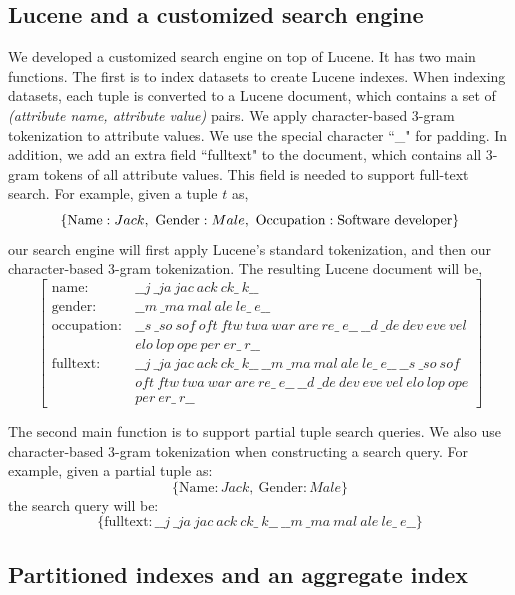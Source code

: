 \subsection{Lucene and a customized search engine}
We developed a customized search engine on top of Lucene. It has two main functions. The first is to index datasets to create Lucene indexes. 
When indexing datasets, each tuple is converted to a Lucene document, which contains a set of \emph{(attribute name, attribute value)} pairs. We apply character-based 3-gram tokenization to attribute values. We use the special character ``\_" for padding. In addition, we add an extra field ``fulltext" to the document, which contains all 3-gram tokens of all attribute values. This field is needed to support full-text search.
For example, given a tuple $t$ as, 
$$
\{\mathrm{Name}:Jack,\ \mathrm{Gender}:Male,\ \mathrm{Occupation}:\makebox{Software developer}\}
$$
our search engine will first apply Lucene's standard tokenization, and then our character-based 3-gram tokenization. The resulting Lucene document will be,
$$
\left[\begin{array}{rl}
\mathrm{name}: & \_\_j\ \_ja\ jac\ ack\ ck\_\ k\_\_ \\
\mathrm{gender}: & \_\_m\ \_ma\ mal\ ale\ le\_\ e\_\_ \\
\mathrm{occupation}: & \_\_s\ \_so\ sof\ oft\ ftw\ twa\ war\ are\ re\_\ e\_\_\ \_\_d\ \_de\ dev\ eve\ vel \\
& elo\ lop\ ope\ per\ er\_\ r\_\_ \\
\mathrm{fulltext}: & \_\_j\ \_ja\ jac\ ack\ ck\_\ k\_\_\ \_\_m\ \_ma\ mal\ ale\ le\_\ e\_\_\ \_\_s\ \_so\ sof \\
& oft\ ftw\ twa\ war\ are\ re\_\ e\_\_\ \_\_d\ \_de\ dev\ eve\ vel\ elo\ lop\ ope \\
& per\ er\_\ r\_\_
\end{array}\right]
$$

The second main function is to support partial tuple search queries. We also use character-based 3-gram tokenization when constructing a search query. For example, given a partial tuple as:
$$
\{\mathrm{Name}:Jack,\ \mathrm{Gender}:Male\}
$$
the search query will be:
$$
\{\mathrm{fulltext}: \_\_j\ \_ja\ jac\ ack\ ck\_\ k\_\_\ \_\_m\ \_ma\ mal\ ale\ le\_\ e\_\_\}
$$

\subsection{Partitioned indexes and an aggregate index}

